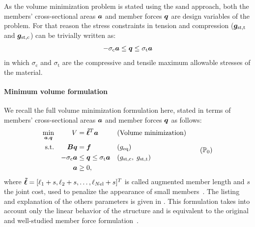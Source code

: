 As the volume minimization problem is stated using the \gls{sand} approach, both the members' cross-sectional areas $\bm{a}$ and member forces $\bm{q}$ are design variables of the problem. For that reason the stress constraints in tension and compression ($\bm{g}_\text{st,t}$ and $\bm{g}_\text{st,c}$) can be trivially written as:
\begin{equation}
    -\sigma_\text{c}\bm{a} \leq \bm{q} \leq \sigma_\text{t}\bm{a}
\end{equation}
in which $\sigma_\text{c}$ and $\sigma_\text{t}$ are the compressive and tensile maximum allowable stresses of the material.

\paragraph{Minimum volume formulation}
We recall the full volume minimization formulation here, stated in terms of members' cross-sectional areas $\bm{a}$ and member forces $\bm{q}$ as follows:
\begin{equation}
    \begin{aligned}
    \min_{\vect{a}, \vect{q}}   && V &= \vect{\tilde{\ell}}^{T}\vect{a} && \textrm{(Volume minimization)}\\
    \textrm{s.t.}   && \matr{B}\vect{q} &= \vect{f} && (g_\text{eq})\\
    && -\sigma_\text{c}\vect{a} &\leq \vect{q} \leq \sigma_\text{t}\vect{a} && (g_\text{st,c}, \; g_\text{st,t}) \\
    && \vect{a} &\geq 0, \\
    \end{aligned}
    \tag{$\mathbb{P}_0$}
    \label{eq:03_optim_original}
\end{equation}
where $\bm{\tilde{\ell}} = [\ell_1 + s, \ell_2 + s, \ldots,\ell_{N\text{el}} + s]^T$ is called augmented member length and $s$ the joint cost, used to penalize the appearance of small members~. The listing and explanation of the others parameters is given in . This formulation takes into account only the linear behavior of the structure and is equivalent to the original and well-studied member force formulation~. 


